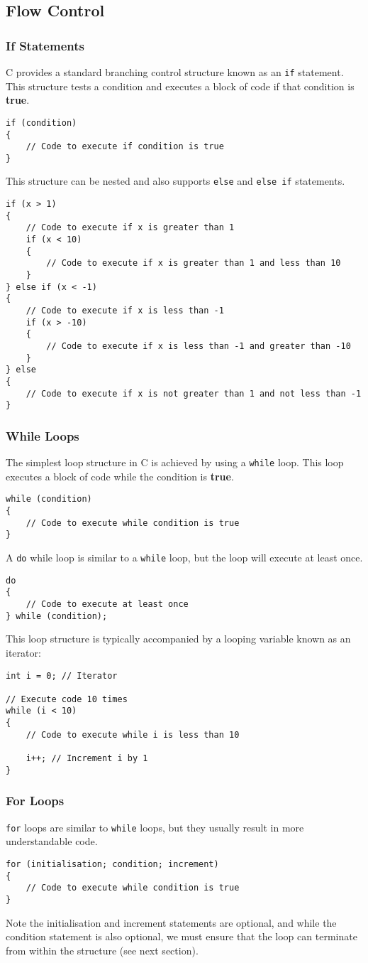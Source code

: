 \documentclass{article}
\begin{document}
\subsection{Flow Control}
\subsubsection{If Statements}
C provides a standard branching control structure known as an
\texttt{if} statement. This structure tests a condition and
executes a block of code if that condition is \textbf{true}.
\begin{verbatim}
if (condition)
{
    // Code to execute if condition is true
}
\end{verbatim}
This structure can be nested and also supports \texttt{else} and
\texttt{else if} statements.
\begin{verbatim}
if (x > 1)
{
    // Code to execute if x is greater than 1
    if (x < 10)
    {
        // Code to execute if x is greater than 1 and less than 10
    }
} else if (x < -1)
{
    // Code to execute if x is less than -1
    if (x > -10)
    {
        // Code to execute if x is less than -1 and greater than -10
    }
} else
{
    // Code to execute if x is not greater than 1 and not less than -1
}
\end{verbatim}
\subsubsection{While Loops}
The simplest loop structure in C is achieved by using a
\texttt{while} loop. This loop executes a block of code while
the condition is \textbf{true}.
\begin{verbatim}
while (condition)
{
    // Code to execute while condition is true
}
\end{verbatim}
A \texttt{do} while loop is similar to a \texttt{while}
loop, but the loop will execute at least once.
\begin{verbatim}
do
{
    // Code to execute at least once
} while (condition);
\end{verbatim}
This loop structure is typically accompanied by a looping variable
known as an iterator:
\begin{verbatim}
int i = 0; // Iterator

// Execute code 10 times
while (i < 10)
{
    // Code to execute while i is less than 10

    i++; // Increment i by 1
}
\end{verbatim}
\subsubsection{For Loops}
\texttt{for} loops are similar to \texttt{while} loops, but they usually result in more understandable code.
\begin{verbatim}
for (initialisation; condition; increment)
{
    // Code to execute while condition is true
}
\end{verbatim}
Note the initialisation and increment statements are optional, and
while the condition statement is also optional, we must ensure that the
loop can terminate from within the structure (see next section).
\end{document}
